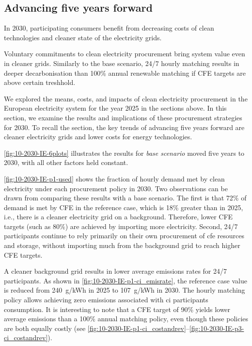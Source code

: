 \subsection{Advancing five years forward}
\label{subsec:time}

\vspace{10pt}
\begin{res}
    In 2030, participating consumers benefit from decreasing costs of clean technologies and cleaner state of the electricity grids.
\end{res}

\vspace{5pt}
\begin{res}
    Voluntary commitments to clean electricity procurement bring system value even in
    cleaner grids. Similarly to the base scenario, 24/7 hourly matching results in deeper decarbonisation than 100\% annual renewable matching if CFE targets are above certain treshhold.
\end{res}

We explored the means, costs, and impacts of clean electricity procurement in the European electricity system for the year 2025 in the sections above.
In this section, we examine the results and implications of these procurement strategies for 2030.
To recall the  section, the key trends of advancing five years forward are cleaner electricity grids and lower costs for energy technologies.

\cref{fig:10-2030-IE-6plots} illustrates the results for \textit{base scenario} moved five years to 2030, with all other factors held constant. 

\cref{fig:10-2030-IE-p1-used} shows the fraction of hourly demand met by clean electricity under each procurement policy in 2030.
Two observations can be drawn from comparing these results with a base scenario.
The first is that 72\% of demand is met by CFE in the reference case, which is 18\% greater than in 2025, i.e., there is a cleaner electricity grid on a background.
Therefore, lower CFE targets (such as 80\%) are achieved by importing more electricity.
Second, 24/7 participants continue to rely primarily on their own procurement of \gls{cfe} resources and storage, without importing much from the background grid to reach higher CFE targets.

A cleaner background grid results in lower average emissions rates for 24/7 participants. 
As shown in \cref{fig:10-2030-IE-p1-ci_emisrate}, the reference case value is reduced from 240~g\co/kWh in 2025 to 107~g\co/kWh in 2030.
The hourly matching policy allows achieving zero emissions associated with \gls{ci} participants consumption.
It is interesting to note that a CFE target of 90\% yields lower average emissions than a 100\% annual matching policy, even though these policies are both equally costly (see \cref{fig:10-2030-IE-p1-ci_costandrev}--\cref{fig:10-2030-IE-p3-ci_costandrev}).

